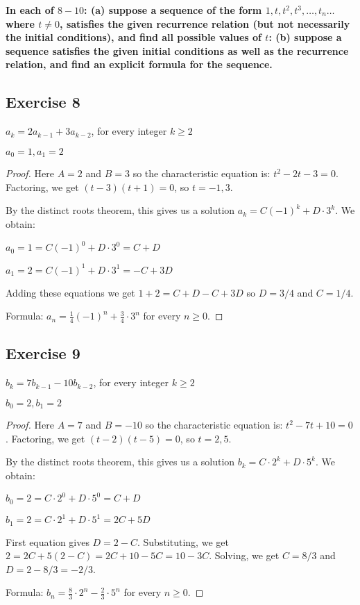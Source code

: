 \documentclass[14pt]{extarticle}
\newcommand{\cy}{\color{cyan}}
\begin{document}
{\bf \cy In each of $8-10$: (a) suppose a sequence of the form \(1, t, t^2, t^3, \ldots, t_n \ldots\) where
\(t \neq 0\), satisfies the given recurrence relation (but not necessarily the initial conditions), and find all
possible values of $t$: (b) suppose a sequence satisfies the given initial conditions as well as the recurrence
relation, and find an explicit formula for the sequence.}

\subsection{Exercise 8}
\(a_k = 2a_{k-1} + 3a_{k-2}\), for every integer \(k \geq 2\)

\(a_0 = 1, a_1 = 2\)

\begin{proof}
    Here $A = 2$ and $B = 3$ so the characteristic equation is: \(t^2 - 2t - 3 = 0\).
    Factoring, we get \((t - 3)(t+1) = 0\), so $t = -1, 3$.

    By the distinct roots theorem, this gives us a solution \(a_k = C(-1)^k + D \cdot 3^k\). We obtain:

    \(a_0 = 1 = C(-1)^0 + D \cdot 3^0 = C + D\)

    \(a_1 = 2 = C(-1)^1 + D \cdot 3^1 = -C + 3D\)

    Adding these equations we get \(1 + 2 = C + D - C + 3D\) so $D = 3/4$ and $C = 1/4$.

    Formula: \(a_n = \frac{1}{4}(-1)^n + \frac{3}{4} \cdot 3^n\) for every \(n \geq 0\).
\end{proof}

\subsection{Exercise 9}
\(b_k = 7b_{k-1} - 10b_{k-2}\), for every integer \(k \geq 2\)

\(b_0 = 2, b_1 = 2\)

\begin{proof}
    Here $A = 7$ and $B = -10$ so the characteristic equation is: \(t^2 - 7t + 10 = 0\).
    Factoring, we get \((t - 2)(t - 5) = 0\), so $t = 2, 5$.

    By the distinct roots theorem, this gives us a solution \(b_k = C \cdot 2^k + D \cdot 5^k\). We obtain:

    \(b_0 = 2 = C \cdot 2^0 + D \cdot 5^0 = C + D\)

    \(b_1 = 2 = C \cdot 2^1 + D \cdot 5^1 = 2C + 5D\)

    First equation gives $D = 2 - C$. Substituting, we get \(2 = 2C + 5(2 - C) = 2C + 10 - 5C = 10 - 3C\). Solving, we get
    $C = 8/3$ and $D = 2-8/3 = -2/3$.

    Formula: \(b_n = \frac{8}{3} \cdot 2^n - \frac{2}{3} \cdot 5^n\) for every \(n \geq 0\).
\end{proof}
\end{document}
